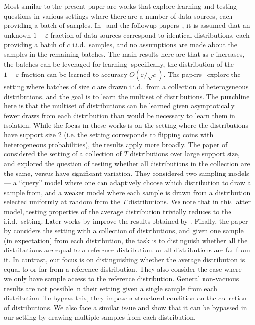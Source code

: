 \documentclass[10pt]{article} %
\def\eps{{\varepsilon}}
\theoremstyle{plain}
\begin{document}
Most similar to the present paper are works that explore learning and testing questions in various settings where there are a number of data sources, each providing a batch of samples.  In~\cite{QiaoV18} and the followup papers~\cite{jain2020optimal,chen2020learning}, it is assumed that an unknown $1-\eps$ fraction of data sources correspond to identical distributions, each providing a batch of $c$ i.i.d.\ samples, and no assumptions are made about the samples in the remaining batches.  The main results here are that as $c$ increases, the batches can be leveraged for learning: specifically, the distribution of the $1-\eps$ fraction can be learned to accuracy $O(\eps/\sqrt{c})$.   The papers~\cite{tian2017learning,vinayak2019maximum} explore the setting where batches of size $c$ are drawn i.i.d.\ from a collection of heterogeneous distributions, and the goal is to learn the multiset of distributions.  The punchline here is that the multiset of distributions can be learned given asymptotically fewer draws from each distribution than would be necessary to learn them in isolation.  While the focus in these works is on the setting where the distributions have support size 2 (i.e. the setting corresponds to flipping coins with heterogeneous probabilities), the results apply more broadly.   The paper of \cite{v009a008} considered the setting of a collection of $T$ distributions over large support size, and explored the question of testing whether all distributions in the collection are the same, versus have significant variation.  They considered two sampling models --- a ``query'' model where one can adaptively choose which distribution to draw a sample from, and a weaker model where each sample is drawn from a distribution selected uniformly at random from the $T$ distributions. 
We note that in this latter model, testing properties of the average distribution trivially reduces to the i.i.d.\ setting. Later works by \cite{diakonikolas2016new, aliakbarpour2016learning} improve the results obtained by \cite{v009a008}. Finally, the paper by \cite{aliakbarpour2019testing}  considers the setting with a collection of distributions, and given one sample (in expectation) from each distribution, the task is to distinguish whether all the distributions are equal to a reference distribution, or all distributions are far from it. In contrast, our focus is on distinguishing whether the average distribution is equal to  or far from a reference distribution. They also consider the case where we only have sample access to the reference distribution. General non-vacuous results are not possible in their setting given a single  sample from each distribution. To bypass this, they impose a structural condition on the collection of distributions. We also face a similar issue and show that it can be bypassed in our setting by drawing multiple samples from each distribution. 
\end{document}
